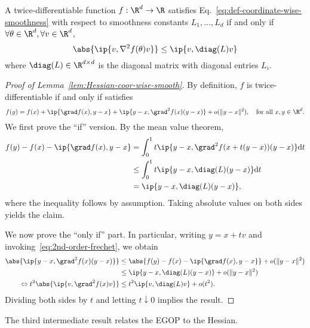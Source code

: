 \begin{lemma}\label{lem:Hessian-coor-wise-smooth}
    A twice-differentiable function $f:\R^d\rightarrow \R$ satisfies Eq.~\ref{eq:def-coordinate-wise-smoothness} with respect to smoothness constants $L_1,\dots,L_d$ if and only if $\forall \theta\in \R^d, \forall v\in \R^d$,
    \[
        \abs{\ip{v, \nabla^2 f(\theta) v}} \leq \ip{v, \diag(L) v}
    \]
    where $\diag(L) \in \R^{d\times d}$ is the diagonal matrix with diagonal entries $L_i$.
\end{lemma}
\begin{proof}[Proof of Lemma~\ref{lem:Hessian-coor-wise-smooth}]
    By definition, $f$ is twice-differentiable if and only if satisfies
    \begin{equation}
        f(y) = f(x) + \ip{\grad f(x), y - x} + \ip{y - x, \grad^2 f(x)(y - x)} + o(\|y - x\|^2),
        \quad \text{for all $x, y \in \R^d$.}
        \label{eq:2nd-order-frechet}
    \end{equation}
    We first prove the ``if'' version. By the mean value theorem,
    \begin{align*}
        f(y) - f(x) - \ip{\grad f(x), y - x} &=
        \int_{0}^1 t \ip{y - x, \grad^2 f(x + t(y - x)) (y - x)} \mathrm{d}t \\
        &\leq
        \int_{0}^1 t \ip{y - x, \diag(L)(y - x)} \mathrm{d}t \\
        &=
        \ip{y - x, \diag(L)(y - x)},
    \end{align*}
    where the inequality follows by assumption. Taking absolute values on both sides yields the claim.

    We now prove the ``only if'' part. In particular, writing $y = x + tv$ and invoking~\eqref{eq:2nd-order-frechet}, we obtain
    \begin{align*}
        \abs{\ip{y - x, \grad^2 f(x)(y - x)}} &\leq
        \abs{f(y) - f(x) - \ip{\grad f(x), y - x}} +
        o(\|y - x\|^2) \\
        &\leq
        \ip{y - x, \diag(L)(y - x)} + o(\|y - x\|^2) \\
        \Leftrightarrow
        t^2 \abs{\ip{v, \grad^2 f(x) v}} &\leq
        t^2 \ip{v, \diag(L)v} + o(t^2).
    \end{align*}
    Dividing both sides by $t$ and letting $t \downarrow 0$ implies the result.
\end{proof}

The third intermediate result relates the EGOP to the Hessian.

